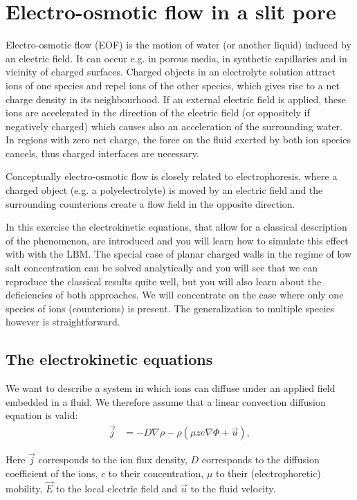 \chapter{Electro-osmotic flow in a slit pore}
Electro-osmotic flow (EOF) is the motion of water (or another liquid)
induced by an electric field. It can occur e.g. in porous media,
in synthetic capillaries and in vicinity of charged surfaces.
Charged objects in an electrolyte solution attract ions of one
species and repel ions of the other species, which gives rise
to a net charge density in its neighbourhood. If an external
electric field is applied, these ions are accelerated in the direction
of the electric field (or oppositely if negatively charged) which
causes also an acceleration of the surrounding water. In regions
with zero net charge, the force on the fluid exerted by both ion
species cancels, thus charged interfaces are necessary.

Conceptually electro-osmotic flow is closely related to electrophoresis,
where a charged object (e.g. a polyelectrolyte) is moved by an
electric field and the surrounding counterions create a flow field
in the opposite direction. 

In this exercise the electrokinetic equations, that allow for a classical
description of the phenomenon, are introduced and you will learn
how to simulate this effect with \ES{} with the LBM. The special case of
planar charged walls in the regime of low salt concentration can
be solved analytically and you will see that we can reproduce the
classical results quite well, but you will also learn about the
deficiencies of both approaches. We will concentrate on the case
where only one species of ions (counterions) is present. The generalization
to multiple species however is straightforward.

\section{The electrokinetic equations}
We want to describe a system in which ions can diffuse under an
applied field embedded in a fluid. We therefore assume that a 
linear convection diffusion equation is valid:
\begin{align*}
		\vec j &=-D\nabla\rho-\rho\left(\mu z e \nabla\Phi+\vec u\right),
\end{align*}

Here $\vec{j}$ corresponds to the ion flux density, $D$ corresponds 
to the diffusion coefficient of the ions,
$c$ to their concentration, $\mu$ to their (electrophoretic)
mobility, $\vec{E}$ to the local electric field and $\vec{u}$
to the fluid velocity.

